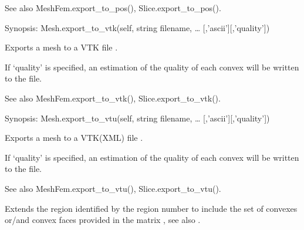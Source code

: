 \documentclass[a4paper,11pt,english]{sphinxmanual}
\begin{document}
\begin{fulllineitems}
\begin{fulllineitems}
See also MeshFem.export\_to\_pos(), Slice.export\_to\_pos().

\end{fulllineitems}


\begin{fulllineitems}
\label{\detokenize{python/cmdref_Mesh:getfem.Mesh.export_to_vtk}}
Synopsis: Mesh.export\_to\_vtk(self, string filename, … {[},’ascii’{]}{[},’quality’{]})

Exports a mesh to a VTK file .

If ‘quality’ is specified, an estimation of the quality of each
convex will be written to the file.

See also MeshFem.export\_to\_vtk(), Slice.export\_to\_vtk().

\end{fulllineitems}


\begin{fulllineitems}
\label{\detokenize{python/cmdref_Mesh:getfem.Mesh.export_to_vtu}}
Synopsis: Mesh.export\_to\_vtu(self, string filename, … {[},’ascii’{]}{[},’quality’{]})

Exports a mesh to a VTK(XML) file .

If ‘quality’ is specified, an estimation of the quality of each
convex will be written to the file.

See also MeshFem.export\_to\_vtu(), Slice.export\_to\_vtu().

\end{fulllineitems}


\begin{fulllineitems}
\label{\detokenize{python/cmdref_Mesh:getfem.Mesh.extend_region}}
Extends the region identified by the region number  to include
the set of convexes or/and convex faces provided in the matrix
, see also .


\end{fulllineitems}
\end{fulllineitems}
\end{document}

